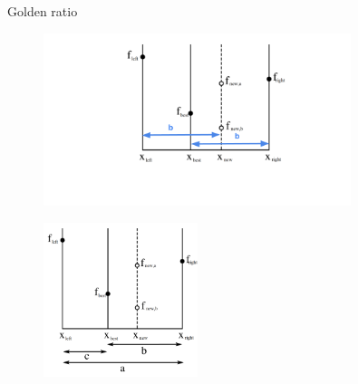\documentclass[11pt,compress,t,notes=noshow, xcolor=table]{beamer}
\begin{document}
\begin{vbframe}{Golden ratio}
\begin{figure}
\includegraphics[width=0.8\textwidth]{figure_man/goldensec-4.png}\\
\end{figure}

\framebreak 

\begin{figure}
\includegraphics[width=0.4\textwidth]{figure_man/goldensec.png}\\
\end{figure}

\end{vbframe}
\end{document}
